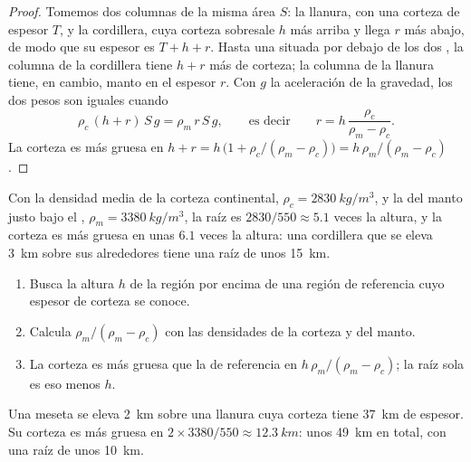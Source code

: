 \begin{proof}
Tomemos dos columnas de la misma área $S$: la llanura, con una corteza de
espesor $T$, y la cordillera, cuya corteza sobresale $h$ más arriba y llega
$r$ más abajo, de modo que su espesor es $T + h + r$. Hasta una  situada por debajo de los dos , la columna de la cordillera
tiene $h + r$ más de corteza; la columna de la llanura tiene, en cambio, manto
en el espesor $r$. Con $g$ la aceleración de la gravedad, los dos pesos son
iguales cuando
\[
  \rho_c\,(h + r)\,S\,g = \rho_m\,r\,S\,g,
  \qquad\text{es decir}\qquad
  r = h\,\frac{\rho_c}{\rho_m - \rho_c}.
\]
La corteza es más gruesa en $h + r = h\,\bigl(1 + \rho_c/(\rho_m - \rho_c)\bigr)
= h\,\rho_m/(\rho_m - \rho_c)$.
\end{proof}

Con la densidad media de la corteza continental, $\rho_c =
\qty{2830}{kg/m^3}$, y la del manto justo bajo el , $\rho_m =
\qty{3380}{kg/m^3}$, la raíz es $2830/550 \approx 5.1$ veces la altura, y la
corteza es más gruesa en unas $6.1$ veces la altura: una cordillera que se
eleva \qty{3}{km} sobre sus alrededores tiene una raíz de unos \qty{15}{km}.

\begin{method}\label{met:g11:lithosphere-asthenosphere:root}
\begin{enumerate}
  \item Busca la altura $h$ de la región por encima de una región de
        referencia cuyo espesor de corteza se conoce.
  \item Calcula $\rho_m/(\rho_m - \rho_c)$ con las densidades de la corteza y
        del manto.
  \item La corteza es más gruesa que la de referencia en $h\,\rho_m/(\rho_m -
        \rho_c)$; la raíz sola es eso menos $h$.
\end{enumerate}
\end{method}

\begin{example}\label{ex:g11:lithosphere-asthenosphere:plateau}
Una meseta se eleva \qty{2}{km} sobre una llanura cuya corteza tiene
\qty{37}{km} de espesor. Su corteza es más gruesa en $2 \times 3380/550 \approx \qty{12.3}{km}$:
unos \qty{49}{km} en total, con una raíz de unos \qty{10}{km}.
\end{example}

